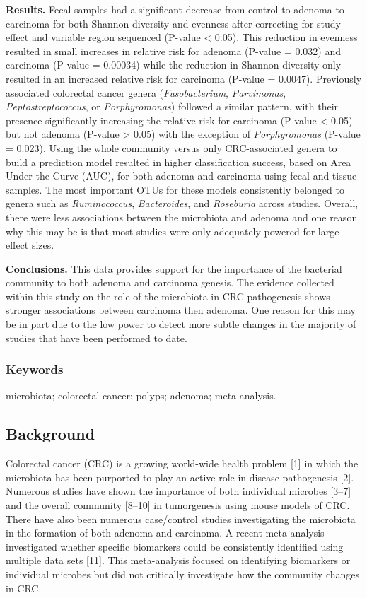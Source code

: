\documentclass[12pt,]{article}
\begin{document}
\textbf{Results.} Fecal samples had a significant decrease from control
to adenoma to carcinoma for both Shannon diversity and evenness after
correcting for study effect and variable region sequenced (P-value
\textless{} 0.05). This reduction in evenness resulted in small
increases in relative risk for adenoma (P-value = 0.032) and carcinoma
(P-value = 0.00034) while the reduction in Shannon diversity only
resulted in an increased relative risk for carcinoma (P-value = 0.0047).
Previously associated colorectal cancer genera (\emph{Fusobacterium},
\emph{Parvimonas}, \emph{Peptostreptococcus}, or \emph{Porphyromonas})
followed a similar pattern, with their presence significantly increasing
the relative risk for carcinoma (P-value \textless{} 0.05) but not
adenoma (P-value \textgreater{} 0.05) with the exception of
\emph{Porphyromonas} (P-value = 0.023). Using the whole community versus
only CRC-associated genera to build a prediction model resulted in
higher classification success, based on Area Under the Curve (AUC), for
both adenoma and carcinoma using fecal and tissue samples. The most
important OTUs for these models consistently belonged to genera such as
\emph{Ruminococcus}, \emph{Bacteroides}, and \emph{Roseburia} across
studies. Overall, there were less associations between the microbiota
and adenoma and one reason why this may be is that most studies were
only adequately powered for large effect sizes.

\textbf{Conclusions.} This data provides support for the importance of
the bacterial community to both adenoma and carcinoma genesis. The
evidence collected within this study on the role of the microbiota in
CRC pathogenesis shows stronger associations between carcinoma then
adenoma. One reason for this may be in part due to the low power to
detect more subtle changes in the majority of studies that have been
performed to date.

\subsubsection{Keywords}\label{keywords}

microbiota; colorectal cancer; polyps; adenoma; meta-analysis.

\newpage

\subsection{Background}\label{background}

Colorectal cancer (CRC) is a growing world-wide health problem {[}1{]}
in which the microbiota has been purported to play an active role in
disease pathogenesis {[}2{]}. Numerous studies have shown the importance
of both individual microbes {[}3--7{]} and the overall community
{[}8--10{]} in tumorgenesis using mouse models of CRC. There have also
been numerous case/control studies investigating the microbiota in the
formation of both adenoma and carcinoma. A recent meta-analysis
investigated whether specific biomarkers could be consistently
identified using multiple data sets {[}11{]}. This meta-analysis focused
on identifying biomarkers or individual microbes but did not critically
investigate how the community changes in CRC.
\end{document}
